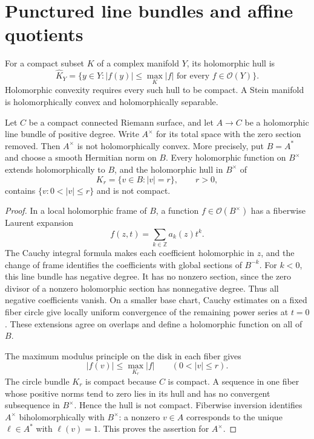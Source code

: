 \section{Punctured line bundles and affine quotients}
\label{sec:elliptic-affine-quotient-hulls}

For a compact subset $K$ of a complex manifold $Y$, its holomorphic hull is
\[
 \widehat K_Y=\{y\in Y:|f(y)|\leq\max_K|f|\text{ for every }f\in\mathcal O(Y)\}.
\]
Holomorphic convexity requires every such hull to be compact. A Stein manifold is holomorphically convex and holomorphically separable.

\begin{lemma}\label{lem:positive-line-puncture-hull}
Let $C$ be a compact connected Riemann surface, and let $A\to C$ be a holomorphic line bundle of positive degree. Write $A^\times$ for its total space with the zero section removed. Then $A^\times$ is not holomorphically convex. More precisely, put $B=A^*$ and choose a smooth Hermitian norm on $B$. Every holomorphic function on $B^\times$ extends holomorphically to $B$, and the holomorphic hull in $B^\times$ of
\[
 K_r=\{v\in B:|v|=r\},\qquad r>0,
\]
contains $\{v:0<|v|\leq r\}$ and is not compact.
\end{lemma}
\begin{proof}
In a local holomorphic frame of $B$, a function $f\in\mathcal O(B^\times)$ has a fiberwise Laurent expansion
\[
 f(z,t)=\sum_{k\in\mathbb Z}a_k(z)t^k.
\]
The Cauchy integral formula makes each coefficient holomorphic in $z$, and the change of frame identifies the coefficients with global sections of $B^{-k}$. For $k<0$, this line bundle has negative degree. It has no nonzero section, since the zero divisor of a nonzero holomorphic section has nonnegative degree. Thus all negative coefficients vanish. On a smaller base chart, Cauchy estimates on a fixed fiber circle give locally uniform convergence of the remaining power series at $t=0$. These extensions agree on overlaps and define a holomorphic function on all of $B$.

The maximum modulus principle on the disk in each fiber gives
\[
 |f(v)|\leq\max_{K_r}|f|\qquad(0<|v|\leq r).
\]
The circle bundle $K_r$ is compact because $C$ is compact. A sequence in one fiber whose positive norms tend to zero lies in its hull and has no convergent subsequence in $B^\times$. Hence the hull is not compact. Fiberwise inversion identifies $A^\times$ biholomorphically with $B^\times$: a nonzero $v\in A$ corresponds to the unique $\ell\in A^*$ with $\ell(v)=1$. This proves the assertion for $A^\times$.
\end{proof}

